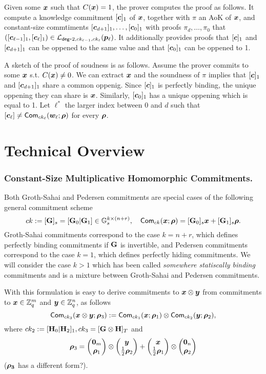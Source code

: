 Given some ${\boldsymbol{x}}$ such that $C({\boldsymbol{x}})= 1$, the prover computes the proof as follows. It compute a knowledge commitment $[{\boldsymbol{c}}]_1$ of ${\boldsymbol{x}}$, together with $\pi$ an AoK of ${\boldsymbol{x}}$, and constant-size commtiments $[{\boldsymbol{c}}_{d+1}]_1,\ldots,[{\boldsymbol{c}}_0]_1$ with proofs $\pi_d,\ldots,\pi_0$ that $([{\boldsymbol{c}}_{\ell-1}]_1,[{\boldsymbol{c}}_\ell]_1)\in\mathcal{L}_{\mathsf{deg}\mbox{-}2,ck_{\ell-1},ck_\ell}({\boldsymbol{p}}_\ell) $. It additionally provides proofs that $[{\boldsymbol{c}}]_1$ and $[{\boldsymbol{c}}_{d+1}]_1$ can be oppened to the same value and that $[{\boldsymbol{c}}_0]_1$  can be oppened to 1.

A sketch of the proof of soudness is as follows. Assume the prover commits to some ${\boldsymbol{x}}$ s.t. $C({\boldsymbol{x}})\neq 0$. We can extract ${\boldsymbol{x}}$ and the soundness of $\pi$ implies that $[{\boldsymbol{c}}]_1$ and $[{\boldsymbol{c}}_{d+1}]_1$ share a common oppenig. Since $[{\boldsymbol{c}}]_1$ is perfectly binding, the unique oppening they can share is ${\boldsymbol{x}}$. Similarly, $[{\boldsymbol{c}}_0]_1$ has a unique oppening which is equal to 1.
Let $\ell^*$ the larger index between $0$ and $d$ such that $[{\boldsymbol{c}}_{\ell}]\neq\mathsf{Com}_{ck_{\ell}}({\boldsymbol{w}}_\ell;{\boldsymbol{\rho}})$ for every ${\boldsymbol{\rho}}$. 
 
\section{Technical Overview}

\subsubsection{Constant-Size  Multiplicative Homomorphic Commitments.}
Both Groth-Sahai and Pedersen commitments are special cases of the following general commitment scheme
$$
ck:=[\mathbf{{G}}]_s=[\mathbf{{G}}_0|\mathbf{{G}}_1]\in\mathbb{G}_s^{k\times (n+r)}, \quad \mathsf{Com}_{ck}({\boldsymbol{x}};{\boldsymbol{\rho}})=[\mathbf{{G}}_0]_s{\boldsymbol{x}}+[\mathbf{{G}}_1]_s{\boldsymbol{\rho}}.
$$
Groth-Sahai commitments correspond to the case $k=n+r$, which defines perfectly binding commitments if $\mathbf{{G}}$ is invertible, and Pedersen commitments correspond to the case $k=1$, which defines perfectly hiding commitments. We will consider the case $k>1$ which has been called \emph{somewhere statiscally binding} commitments and is a mixture between Groth-Sahai and Pedersen commitments.

With this formulation is easy to derive commitments to ${\boldsymbol{x}}\otimes{\boldsymbol{y}}$ from commitments to ${\boldsymbol{x}}\in\mathbb{Z}_q^m$ and ${\boldsymbol{y}}\in\mathbb{Z}_q^n$, as follows
$$
\mathsf{Com}_{ck_3}({\boldsymbol{{\boldsymbol{x}}}}\otimes{\boldsymbol{y}};{\boldsymbol{\rho}}_3):=\mathsf{Com}_{ck_1}({\boldsymbol{x}};{\boldsymbol{\rho}}_1)\otimes\mathsf{Com}_{ck_2}({\boldsymbol{y}};{\boldsymbol{\rho}}_2),
$$
where $ck_2:=[\mathbf{{H}}_0|\mathbf{{H}}_2]_1,ck_3=[\mathbf{{G}}\otimes\mathbf{{H}}]_T$ and
$${\boldsymbol{\rho}}_3=\left(\begin{matrix}{\boldsymbol{0}}_m\\{\boldsymbol{\rho}}_1\end{matrix}\right)\otimes\left(\begin{matrix}{\boldsymbol{y}}\\\frac{1}{2}{\boldsymbol{\rho}}_2\end{matrix}\right)+\left(\begin{matrix}{\boldsymbol{x}}\\\frac{1}{2}{\boldsymbol{\rho}}_1\end{matrix}\right)\otimes\left(\begin{matrix}{\boldsymbol{0}}_n\\{\boldsymbol{\rho}}_2\end{matrix}\right)$$ (${\boldsymbol{\rho_3}}$ has a different form?).

